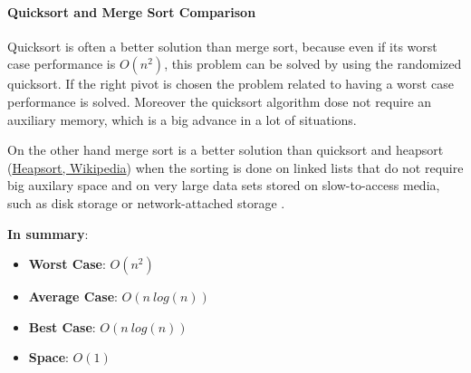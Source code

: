 \paragraph{Quicksort and Merge Sort Comparison}
Quicksort is often a better solution than merge sort, because even if its worst case performance is \(O(n^{2})\), this problem can be solved by using the randomized quicksort. If the right pivot is chosen the problem related to having a worst case performance is solved. Moreover the quicksort algorithm dose not require an auxiliary memory, which is a big advance in a lot of situations.

On the other hand merge sort is a better solution than quicksort and heapsort \cite{wikiheapsort} (\href{https://en.wikipedia.org/wiki/Heapsort}{Heapsort, Wikipedia}) when the sorting is done on linked lists that do not require big auxilary space and on very large data sets stored on slow-to-access media, such as disk storage or network-attached storage \cite{wikiqicksort}.

\textbf{In summary}:
\begin{itemize}
\item \textbf{Worst Case}: \(O(n^{2})\)
\item \textbf{Average Case}: \(O(n\ log(n))\)
\item \textbf{Best Case}: \(O(n\ log(n))\)
\item \textbf{Space}: \(O(1)\)
\end{itemize}

